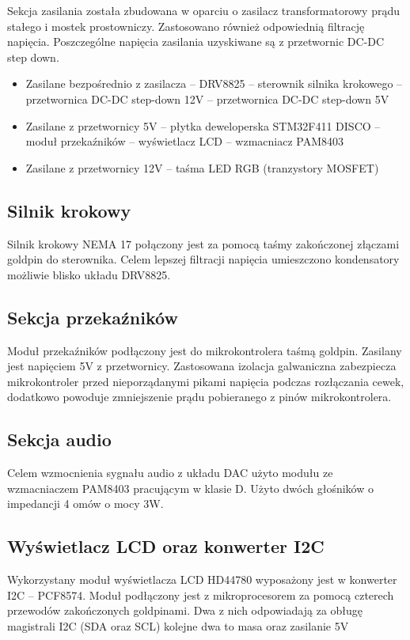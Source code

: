 \documentclass[10pt, a4paper]{article}
\begin{document}
Sekcja zasilania została zbudowana w oparciu o zasilacz transformatorowy prądu stałego i mostek prostowniczy. Zastosowano również odpowiednią filtrację napięcia. Poszczególne napięcia zasilania uzyskiwane są z przetwornic DC-DC step down.

\begin{itemize}
    \item Zasilane bezpośrednio z zasilacza
    \subitem -- DRV8825 -- sterownik silnika krokowego
    \subitem -- przetwornica DC-DC step-down 12V
    \subitem -- przetwornica DC-DC step-down 5V
    
    \item Zasilane z przetwornicy 5V
    \subitem -- płytka deweloperska STM32F411 DISCO
    \subitem -- moduł przekaźników
    \subitem -- wyświetlacz LCD
    \subitem -- wzmacniacz PAM8403
    
    \item Zasilane z przetwornicy 12V
    \subitem -- taśma LED RGB (tranzystory MOSFET)
    
\end{itemize}


\subsection{Silnik krokowy}
Silnik krokowy NEMA 17 połączony jest za pomocą taśmy zakończonej złączami goldpin do sterownika. Celem lepszej filtracji napięcia umieszczono kondensatory możliwie blisko układu DRV8825.

\subsection{Sekcja przekaźników}
Moduł przekaźników podłączony jest do mikrokontrolera taśmą goldpin. Zasilany jest napięciem 5V z przetwornicy. Zastosowana izolacja galwaniczna zabezpiecza mikrokontroler przed nieporządanymi pikami napięcia podczas rozłączania cewek, dodatkowo powoduje zmniejszenie prądu pobieranego z pinów mikrokontrolera.

\subsection{Sekcja audio}
Celem wzmocnienia sygnału audio z układu DAC użyto modułu ze wzmacniaczem PAM8403 pracującym w klasie D. Użyto dwóch głośników o impedancji 4 omów o mocy 3W.

\subsection{Wyświetlacz LCD oraz konwerter I2C}
Wykorzystany moduł wyświetlacza LCD HD44780 wyposażony jest w konwerter I2C -- PCF8574. Moduł podłączony jest z mikroprocesorem za pomocą czterech przewodów zakończonych goldpinami. Dwa z nich odpowiadają za obługę magistrali I2C (SDA oraz SCL) kolejne dwa to masa oraz zasilanie 5V
\end{document}
